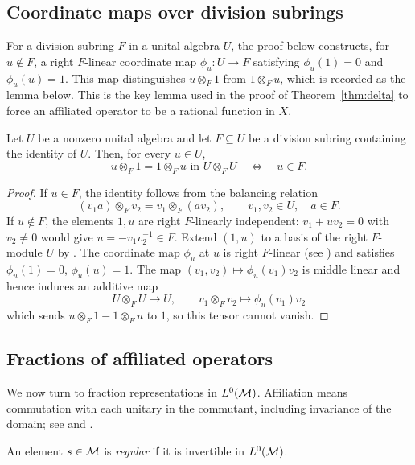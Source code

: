 \subsection{Coordinate maps over division subrings}

For a division subring $F$ in a unital algebra $U$, the proof below constructs, for $u\notin F$, a right $F$-linear coordinate map $\phi_u:U\longrightarrow F$ satisfying $\phi_u(1)=0$ and $\phi_u(u)=1$.
This map distinguishes $u\otimes_F1$ from $1\otimes_Fu$, which is recorded as the lemma below.
This is the key lemma used in the proof of Theorem~\ref{thm:delta} to force an affiliated operator to be a rational function in $X$.

\begin{lemma}\label{lem:equalizer}
Let $U$ be a nonzero unital algebra and let $F\subseteq U$ be a division subring containing the identity of $U$.
Then, for every $u\in U$,
\[
 u\otimes_F1=1\otimes_Fu\text{ in }U\otimes_FU
 \quad\Longleftrightarrow\quad u\in F.
\]
\end{lemma}
\begin{proof}
If $u\in F$, the identity follows from the balancing relation
\[
 (v_1a)\otimes_F v_2=v_1\otimes_F (av_2),\qquad v_1,v_2\in U,\quad a\in F.
\]
If $u\notin F$, the elements $1,u$ are right $F$-linearly independent: $v_1+uv_2=0$ with $v_2\ne0$ would give $u=-v_1v_2^{-1}\in F$.
Extend $(1,u)$ to a basis of the right $F$-module $U$ by \cite[Theorem~IV.2.4]{Hun74}.
The coordinate map $\phi_u$ at $u$ is right $F$-linear (see \cite[Theorem~IV.2.1 \& Theorem~4.11]{Hun74}) and satisfies $\phi_u(1)=0$, $\phi_u(u)=1$.
The map $(v_1,v_2)\mapsto\phi_u(v_1)v_2$ is middle linear and hence induces an additive map \cite[Definition~IV.5.1 and Theorem~IV.5.2]{Hun74}
\[
 U\otimes_FU\longrightarrow U,\qquad v_1\otimes_Fv_2\longmapsto\phi_u(v_1)v_2
\]
which sends $u\otimes_F1-1\otimes_Fu$ to $1$, so this tensor cannot vanish.
\end{proof}

\subsection{Fractions of affiliated operators}\label{subsec:rational-affiliated}

We now turn to fraction representations in $L^0(\mathcal M)$.
Affiliation means commutation with each unitary in the commutant, including invariance of the domain; see \cite[Section 7.2]{AP18} and \cite[Section 5.1]{MSY23}.

\begin{definition}\label{def:regular}
An element $s\in\mathcal M$ is \emph{regular} if it is invertible in $L^0(\mathcal M)$.
\end{definition}

